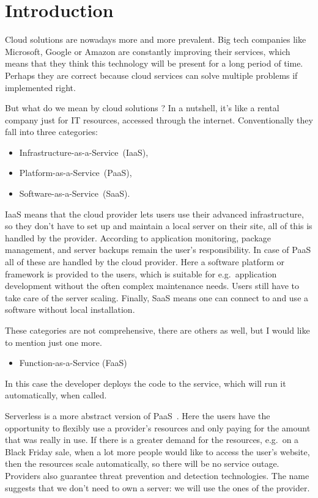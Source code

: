 \chapter{Introduction}\label{Introduction}

Cloud solutions are nowadays more and more prevalent. Big tech companies like Microsoft, Google or Amazon are constantly improving their services, which means that they think this technology will be present for a long period of time. Perhaps they are correct because cloud services can solve multiple problems if implemented right.

But what do we mean by cloud solutions \cite{CloudDef}? In a nutshell, it's like a rental company just for IT resources, accessed through the internet. Conventionally they fall into three categories: 
\begin{itemize}
	\item Infrastructure-as-a-Service~(IaaS),
	\item Platform-as-a-Service~(PaaS),
	\item Software-as-a-Service~(SaaS).
\end{itemize}

IaaS means that the cloud provider lets users use their advanced infrastructure, so they don't have to set up and maintain a local server on their site, all of this is handled by the provider. According to \cite{AzurePatterns} application monitoring, package management, and server backups remain the user's responsibility.
In case of PaaS all of these are handled by the cloud provider. Here a software platform or framework is provided to the users, which is suitable for e.g.\ application development without the often complex maintenance needs. Users still have to take care of the server scaling.
Finally, SaaS means one can connect to and use a software without local installation.

These categories are not comprehensive, there are others as well, but I would like to mention just one more.
\begin{itemize}
	\item Function-as-a-Service (FaaS)~\cite{FaaS}
\end{itemize}
In this case the developer deploys the code to the service, which will run it automatically, when called.  

Serverless is a more abstract version of PaaS~\cite{ServerlessDef}. Here the users have the opportunity to flexibly use a provider's resources and only paying for the amount that was really in use. If there is a greater demand for the resources, e.g.\ on a Black Friday sale, when a lot more people would like to access the user's website, then the resources scale automatically, so there will be no service outage. Providers also guarantee threat prevention and detection technologies. The name suggests that we don't need to own a server: we will use the ones of the provider.

